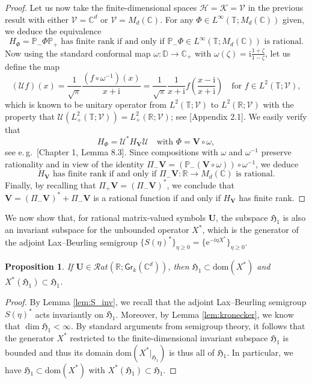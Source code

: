\documentclass[11pt,reqno]{amsart}
\newtheorem{prop}{Proposition}[section]
\theoremstyle{definition}
\theoremstyle{remark}
\theoremstyle{remark}
\numberwithin{equation}{section}
\newcommand{\Hfr}{\mathfrak{H}}
\newcommand{\C}{\mathbb{C}}
\newcommand{\R}{\mathbb{R}}
\newcommand{\T}{\mathbb{T}}
\newcommand{\UU}{\mathcal{U}}
\newcommand{\VV}{\mathcal{V}}
\newcommand{\dom}{\mathrm{dom}}
\newcommand{\ii}{\mathrm{i}}
\newcommand{\eu}{\mathrm{e}}
\newcommand{\Vb}{\mathbf{V}}
\newcommand{\Ub}{\mathbf{U}}
\newcommand{\Gr}{\mathsf{Gr}}
\begin{document}
\begin{proof}
Let us now take the finite-dimensional spaces $\mathcal{H}=\mathcal{K} = \VV$ in the previous result with either $\VV = \C^d$ or $\VV = M_d(\C)$. For any $\Phi \in L^\infty(\T; M_d(\C))$ given, we deduce  the equivalence
$$
\mbox{$H_{\Phi} = \mathbb{P}_- \Phi \mathbb{P}_+$ has finite rank if and only if $\mathbb{P}_- \Phi \in L^\infty(\T; M_d(\C))$ is rational.}
$$
Now using the standard conformal map $\omega : \mathbb{D} \to \C_+$ with $\omega(\zeta) = \ii \frac{1 + \zeta}{1-\zeta}$, let us define the map
$$
(\UU f)(x) = \frac{1}{\sqrt{\pi}} \frac{(f \circ \omega^{-1})(x)}{x+\ii} = \frac{1}{\sqrt{\pi}} \frac{1}{x+ \ii} f \left ( \frac{x-\ii}{x+\ii} \right ) \quad \mbox{for $f \in L^2(\T; \VV)$},
$$
which is known to be unitary operator from $L^2(\T; \VV)$ to $L^2(\R; \VV)$ with the property that $\mathcal{U}(L^2_+(\T; \VV)) = L^2_+(\R; \VV)$; see \cite{Pe-03}[Appendix 2.1]. We easily verify that
$$
H_{\Phi} = \UU^* H_{\Vb} \UU \quad \mbox{with $\Phi = \Vb \circ \omega$},
$$
see e.\,g.~\cite{Pe-03}[Chapter 1, Lemma 8.3]. Since compositions with $\omega$ and $\omega^{-1}$ preserve rationality and in view of the identity $\Pi_-  \Vb = (\mathbb{P}_- ( \Vb \circ \omega)) \circ \omega^{-1}$, we deduce 
$$
\mbox{$H_{\Vb}$ has finite rank if and only if $\Pi_- \Vb : \R \to M_d(\C)$ is rational.}
$$ 
Finally, by recalling that $\Pi_+ \Vb = (\Pi_- \Vb)^*$, we conclude that $\Vb = (\Pi_- \Vb)^* + \Pi_- \Vb$ is a rational function if and only if $H_{\Vb}$ has finite rank.
\end{proof}

We now show that, for rational matrix-valued symbols $\Ub$, the subspace $\Hfr_1$ is also an invariant subspace for the unbounded operator $X^*$, which is the generator of the adjoint Lax--Beurling semigroup $\{ S(\eta)^* \}_{\eta \geq 0}=\{ \eu^{-\ii \eta X^*}  \}_{\eta \geq 0}$.

\begin{prop} \label{prop:G_invariant}
If $\Ub \in \mathcal{R}at(\R; \Gr_k(\C^d))$, then $\Hfr_1 \subset \dom(X^*)$ and $X^*(\Hfr_1) \subset \Hfr_1$.
\end{prop}

\begin{proof}
By Lemma \ref{lem:S_inv}, we recall that the adjoint Lax--Beurling semigroup $S(\eta)^*$ acts invariantly on $\Hfr_1$. Moreover, by Lemma \ref{lem:kronecker}, we know that $\dim \Hfr_1 < \infty$. By standard arguments from semigroup theory, it follows that the generator $X^*$ restricted to the finite-dimensional invariant subspace $\Hfr_1$ is bounded and thus its domain $\dom (X^*|_{\Hfr_1})$ is thus all of $\Hfr_1$. In particular, we have $\Hfr_1 \subset \dom (X^*)$ with $X^*(\Hfr_1) \subset \Hfr_1$.
\end{proof}
\end{document}
